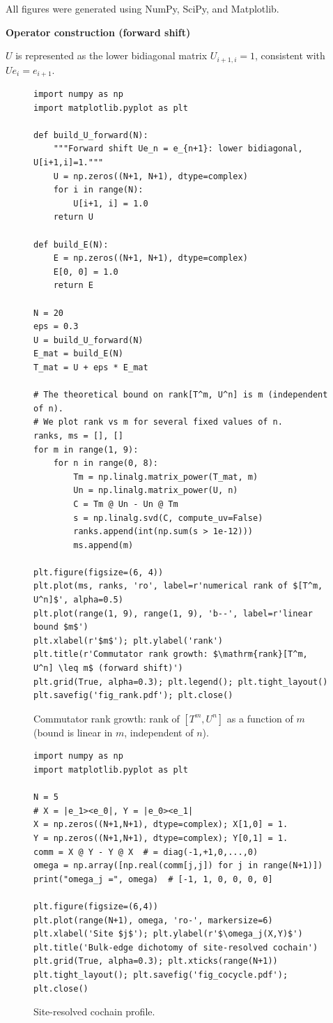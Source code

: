 \documentclass[10pt]{amsart}
\newcommand{\1}{{\mathbb{I}}}
\numberwithin{equation}{section}
\begin{document}
All figures were generated using NumPy, SciPy, and Matplotlib.

\textbf{Operator construction (forward shift)}

$U$ is represented as the lower bidiagonal matrix $U_{i+1,i}=1$, consistent with
$Ue_i = e_{i+1}$.

\begin{figure}[htbp]
\centering
\begin{lstlisting}[style=python]
import numpy as np
import matplotlib.pyplot as plt

def build_U_forward(N):
    """Forward shift Ue_n = e_{n+1}: lower bidiagonal, U[i+1,i]=1."""
    U = np.zeros((N+1, N+1), dtype=complex)
    for i in range(N):
        U[i+1, i] = 1.0
    return U

def build_E(N):
    E = np.zeros((N+1, N+1), dtype=complex)
    E[0, 0] = 1.0
    return E

N = 20
eps = 0.3
U = build_U_forward(N)
E_mat = build_E(N)
T_mat = U + eps * E_mat

# The theoretical bound on rank[T^m, U^n] is m (independent of n).
# We plot rank vs m for several fixed values of n.
ranks, ms = [], []
for m in range(1, 9):
    for n in range(0, 8):
        Tm = np.linalg.matrix_power(T_mat, m)
        Un = np.linalg.matrix_power(U, n)
        C = Tm @ Un - Un @ Tm
        s = np.linalg.svd(C, compute_uv=False)
        ranks.append(int(np.sum(s > 1e-12)))
        ms.append(m)

plt.figure(figsize=(6, 4))
plt.plot(ms, ranks, 'ro', label=r'numerical rank of $[T^m, U^n]$', alpha=0.5)
plt.plot(range(1, 9), range(1, 9), 'b--', label=r'linear bound $m$')
plt.xlabel(r'$m$'); plt.ylabel('rank')
plt.title(r'Commutator rank growth: $\mathrm{rank}[T^m, U^n] \leq m$ (forward shift)')
plt.grid(True, alpha=0.3); plt.legend(); plt.tight_layout()
plt.savefig('fig_rank.pdf'); plt.close()
\end{lstlisting}
\caption{Commutator rank growth: rank of $[T^m, U^n]$ as a function of $m$ (bound is linear in $m$, independent of $n$).}
\label{code:fig4}
\end{figure}

\begin{figure}[htbp]
\centering
\begin{lstlisting}[style=python]
import numpy as np
import matplotlib.pyplot as plt

N = 5
# X = |e_1><e_0|, Y = |e_0><e_1|
X = np.zeros((N+1,N+1), dtype=complex); X[1,0] = 1.
Y = np.zeros((N+1,N+1), dtype=complex); Y[0,1] = 1.
comm = X @ Y - Y @ X  # = diag(-1,+1,0,...,0)
omega = np.array([np.real(comm[j,j]) for j in range(N+1)])
print("omega_j =", omega)  # [-1, 1, 0, 0, 0, 0]

plt.figure(figsize=(6,4))
plt.plot(range(N+1), omega, 'ro-', markersize=6)
plt.xlabel('Site $j$'); plt.ylabel(r'$\omega_j(X,Y)$')
plt.title('Bulk-edge dichotomy of site-resolved cochain')
plt.grid(True, alpha=0.3); plt.xticks(range(N+1))
plt.tight_layout(); plt.savefig('fig_cocycle.pdf'); plt.close()
\end{lstlisting}
\caption{Site-resolved cochain profile.}
\label{code:fig7}
\end{figure}
\end{document}
